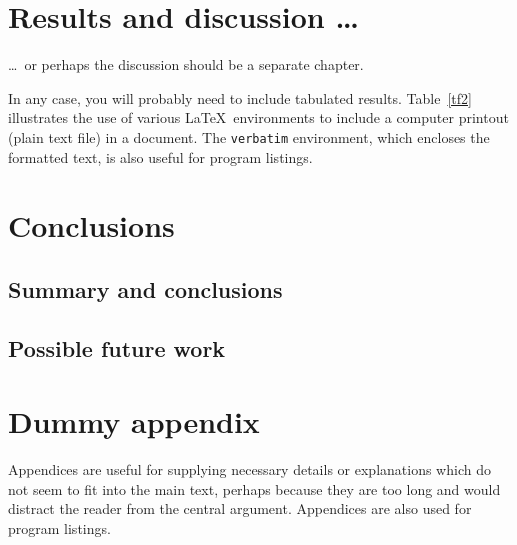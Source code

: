 \documentclass[12pt,openany,a4paper]{book}
\newcommand{\tab}[1]  {Table~\ref{#1}}		%
\begin{document}
\chapter{Results and discussion \ldots}

\ldots\ or perhaps the discussion should be a separate chapter.

In any case, you will probably need to include tabulated results.
\tab{tf2} illustrates the use of various \LaTeX\ environments to
include a computer printout (plain text file) in a document.  The
\texttt{verbatim} environment, which encloses the formatted text, is
also useful for program listings.

\chapter{Conclusions}

\section{Summary and conclusions}

\section{Possible future work}

\appendix


\newpage
{}
\mbox{}
\newpage



\chapter{Dummy appendix}

Appendices are useful for supplying necessary details or explanations
which do not seem to fit into the main text, perhaps because they are
too long and would distract the reader from the central argument.
Appendices are also used for program listings.
\end{document}
